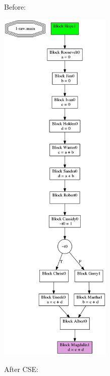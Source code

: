 \documentclass[11pt]{article}
\begin{document}
  Before: 

  \includegraphics[width=0.4\textwidth]{./before_cse.png}
  
  After CSE:
\end{document}
